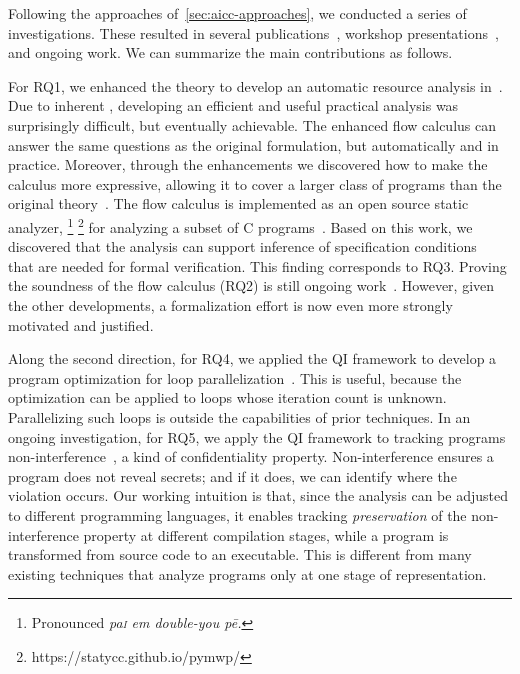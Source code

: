 Following the approaches of~\autoref{sec:aicc-approaches}, we conducted a series
of investigations. These resulted in several
publications~\cite{aubert20222,aubert20232,aubert2023b}, workshop
presentations~\cite{aubert20231,aubert202217,splash22}, and ongoing work.
We can summarize the main contributions as follows.

For RQ1, we enhanced the theory to develop an automatic resource analysis
in~\cite{aubert20222,aubert2023b,rusch2025}. Due to inherent
, developing an efficient and useful
practical analysis was surprisingly difficult, but eventually achievable. The
enhanced flow calculus can answer the same questions as the original
formulation, but automatically and in practice. Moreover, through the
enhancements we discovered how to make the calculus more expressive, allowing it
to cover a larger class of programs than the original theory~\cite{rusch2025}.
The flow calculus is implemented as an open source static analyzer,
%
\footnote{Pronounced \emph{pa\textsc{i} em double-you p\={e}.}}%
\footnote{https://statycc.github.io/pymwp/}
for analyzing a subset
of C programs~\cite{aubert2023b}. Based on this work, we discovered that the
analysis can support inference of specification conditions~\cite{rusch2025} that
are needed for formal verification. This finding corresponds to RQ3. Proving the
soundness of the flow calculus (RQ2) is still
ongoing work~\cite{aubert20232}. However, given the other developments, a
formalization effort is now even more strongly motivated and justified.

Along the second direction, for RQ4, we applied the QI framework to develop a
program optimization for loop parallelization~\cite{aubert20232}. This is
useful, because the optimization can be applied to loops whose iteration count
is unknown. Parallelizing such loops is outside the capabilities of prior
techniques. In an ongoing investigation, for RQ5, we apply the QI framework to
tracking programs {non\hyp{}interference}~\cite{goguen1982}, a kind of
confidentiality property. Non-interference ensures a
program does not reveal secrets; and if it does, we can identify where the
violation occurs. Our working intuition is that, since the analysis can be
adjusted to different programming languages, it enables tracking
\emph{preservation} of the non-interference property at different compilation
stages, while a program is transformed from source code to an executable. This
is different from many existing techniques that analyze programs only at one
stage of representation.

